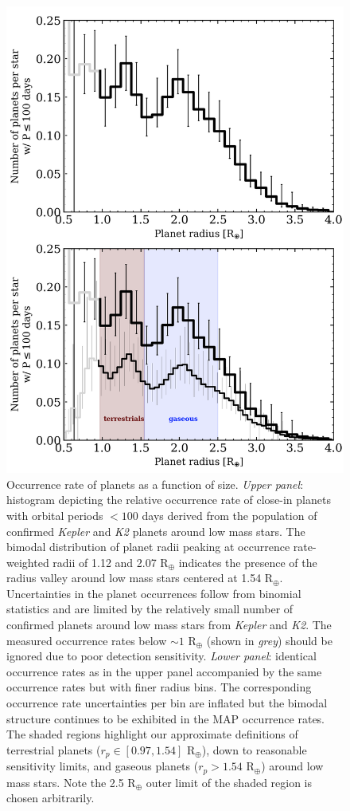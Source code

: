 \documentclass[twocolumn]{emulateapj}
\newcommand{\kepler}[1]{\emph{Kepler}#1}
\newcommand{\ktwo}[1]{\emph{K2}#1}
\begin{document}
  
\begin{figure}
  \centering
  \includegraphics[scale=.8]{figures/rphist_double.png}
  \caption{Occurrence rate of planets as a function of size. \emph{Upper panel}:
    histogram depicting the relative occurrence
    rate of close-in planets with orbital periods $<100$ days derived from the population of confirmed
    \kepler{} and \ktwo{} planets around low mass stars. The bimodal distribution of planet radii peaking
    at occurrence rate-weighted radii of 1.12 and 2.07 R$_{\oplus}$ indicates the presence of the radius valley
    around low mass stars centered at 1.54 R$_{\oplus}$. Uncertainties in the planet occurrences follow from binomial
    statistics and are limited by
    the relatively small number of confirmed planets around low mass stars from \kepler{} and \ktwo{.} 
    The measured occurrence rates below $\sim 1$ R$_{\oplus}$ (shown in \emph{grey}) should be ignored due to
    poor detection sensitivity. \emph{Lower panel}: identical occurrence rates as in the upper panel 
    accompanied by the same occurrence rates but with finer radius bins.
    The corresponding occurrence rate uncertainties per bin are inflated but the bimodal structure continues
    to be exhibited in the MAP occurrence rates. The shaded regions highlight our approximate
    definitions of terrestrial planets ($r_p \in [0.97,1.54]$ R$_{\oplus}$), down to reasonable sensitivity limits,
    and gaseous planets ($r_p > 1.54$ R$_{\oplus}$) around low mass stars. Note the 2.5 R$_{\oplus}$ outer limit of
    the shaded region is chosen arbitrarily.}
  \label{fig:rphist}
\end{figure}
\end{document}
